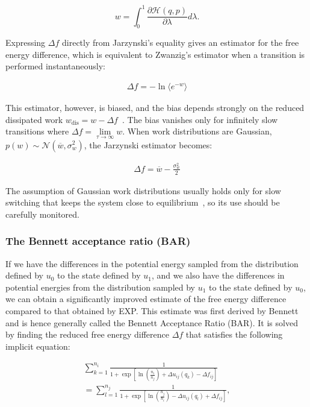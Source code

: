 \begin{equation}\label{eqn.work_value}
w   = \int_{0}^{1} \frac{\partial \mathcal{H}(q,p)}{\partial\lambda} d\lambda.  
\end{equation}

Expressing $\Delta f$ directly from Jarzynski's equality gives an estimator for the free energy difference, which is equivalent to Zwanzig's estimator when a transition is performed instantaneously:

\begin{eqnarray}\label{eqn.jarzynski_estimator}
\Delta f = -\ln\langle e^{-w} \rangle
\end{eqnarray}

This estimator, however, is biased, and the bias depends strongly on the reduced dissipated work $w_{\mathrm{dis}}=w-\Delta f$~\cite{gore2003bias}.
The bias vanishes only for infinitely slow transitions where $\Delta f = \lim\limits_{\tau \to \infty} w$.
When work distributions are Gaussian, $p(w) \sim \mathcal{N}(\overline{w},\sigma_w^2)$, the Jarzynski estimator becomes:

\begin{eqnarray}\label{eqn.jarzynski_gaussian}
\Delta f = \overline{w} - \frac{\sigma_w^2}{2}
\end{eqnarray}

The assumption of Gaussian work distributions usually holds only for slow switching that keeps the system close to equilibrium~\cite{jarzynski1997nonequilibrium}, so its use should be carefully monitored.

\subsubsection{The Bennett acceptance ratio (BAR)}
If we have the differences in the potential energy sampled from the distribution defined by $u_0$ to the state defined by $u_1$, and we also have the differences in potential energies from the distribution sampled by $u_1$ to the state defined by $u_0$, we can obtain a significantly improved estimate of the
free energy difference compared to that obtained by EXP. 
This estimate was first derived by Bennett and is hence generally called the Bennett Acceptance Ratio (BAR). It is solved by finding the reduced free energy difference $\Delta f$ that satisfies the following implicit equation:

\begin{eqnarray}
 \sum_{k=1}^{n_i} \frac{1}{1 + \exp[\ln(\frac{n_i}{n_j}) + \Delta u_{ij}(q_k) - \Delta f_{ij}
 ]} \nonumber \\
 =\sum_{l=1}^{n_j} \frac{1}{1 + \exp[\ln(\frac{n_j}{n_i}) - \Delta u_{ij}(q_l) + \Delta f_{ij}]}, \label{eq:bar}
\end{eqnarray}

